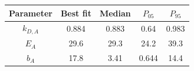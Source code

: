 \begin{tabular}{ccccc}
\toprule
Parameter & Best fit & Median & $P_{05}$ & $P_{95}$\\
\midrule
$k_{D,A}$ & 0.884 & 0.883 & 0.64 & 0.983\\
$E_{A}$ & 29.6 & 29.3 & 24.2 & 39.3\\
$b_A$ & 17.8 & 3.41 & 0.644 & 14.4\\
\bottomrule
\end{tabular}
